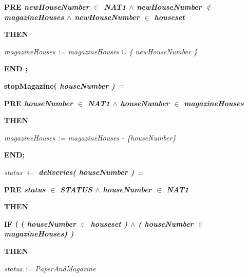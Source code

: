 \documentclass[11pt]{article}
\begin{document}
\begin{sloppypar}
\hspace*{0.60in}\bf PRE \it newHouseNumber  $\in$  \bf NAT1  $\land$  \it newHouseNumber  $\not\in$  \it magazineHouses  $\land$  \it newHouseNumber  $\in$  \it houseset

\hspace*{0.60in}\bf THEN

\hspace*{0.80in}\it magazineHouses \rm := \it magazineHouses  $\cup$  \rm \{ \it newHouseNumber \rm \}

\hspace*{0.60in}\bf END \rm ;

\hspace*{0.40in}

\hspace*{0.40in}\bf stopMagazine\rm ( \it houseNumber \rm ) \rm =

\hspace*{0.60in}\bf PRE \it houseNumber  $\in$  \bf NAT1  $\land$  \it houseNumber  $\in$  \it magazineHouses

\hspace*{0.60in}\bf THEN

\hspace*{0.80in}\it magazineHouses \rm := \it magazineHouses \rm - \rm \{\it houseNumber\rm \}

\hspace*{0.60in}\bf END\rm ;

\hspace*{0.60in}

\hspace*{0.40in}\it status\hspace*{0.10in} $\leftarrow$  \bf deliveries\rm ( \it houseNumber \rm ) \rm =

\hspace*{0.60in}\bf PRE \it status  $\in$  \it STATUS\hspace*{0.10in} $\land$ \hspace*{0.10in}\it houseNumber  $\in$  \bf NAT1 

\hspace*{0.60in}\bf THEN

\hspace*{0.80in}\bf IF \rm ( \rm ( \it houseNumber  $\in$  \it houseset \rm )  $\land$  \rm ( \it houseNumber  $\in$  \it magazineHouses\rm ) \rm )

\hspace*{0.80in}\bf THEN

\hspace*{1.10in}\it status \rm := \it PaperAndMagazine\hspace*{0.10in}


\end{sloppypar}
\end{document}
